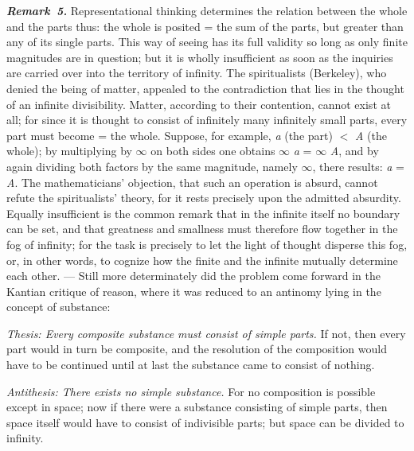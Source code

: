 \documentclass[12pt]{book}
\newcommand{\anm}[1]{\emph{\textbf{Remark~#1.}}}
\begin{document}
\anm{5} Representational thinking determines the relation between the whole
and the parts thus: the whole is posited = the sum of the parts, but greater
than any of its single parts. This way of seeing has its full validity so
long as only finite magnitudes are in question; but it is wholly
insufficient as soon as the inquiries are carried over into the territory of
infinity. The spiritualists (Berkeley), who denied the being of matter,
appealed to the contradiction that lies in the thought of an infinite
divisibility. Matter, according to their contention, cannot exist at all;
for since it is thought to consist of infinitely many infinitely small
parts, every part must become = the whole. Suppose, for example,
\textit{a} (the part) $<$ \textit{A} (the whole); by multiplying by $\infty$
on both sides one obtains $\infty$ \textit{a} = $\infty$ \textit{A}, and by
again dividing both factors by the same magnitude, namely $\infty$, there
results: \textit{a} = \textit{A}. The mathematicians' objection, that such
an operation is absurd, cannot refute the spiritualists' theory, for it
rests precisely upon the admitted absurdity. Equally insufficient is the
common remark that in the infinite itself no boundary can be set, and that
greatness and smallness must therefore flow together in the fog of infinity;
for the task is precisely to let the light of thought disperse this fog, or,
in other words, to cognize how the finite and the infinite mutually
determine each other. --- Still more determinately did the problem come
forward in the Kantian critique of reason, where it was reduced to an
antinomy lying in the concept of substance:

\emph{Thesis: Every composite substance must consist of simple parts.} If
not, then every part would in turn be composite, and the resolution of the
composition would have to be continued until at last the substance came to
consist of nothing.

\emph{Antithesis: There exists no simple substance.} For no composition is
possible except in space; now if there were a substance consisting of
simple parts, then space itself would have to consist of indivisible parts;
but space can be divided to infinity.
\end{document}
